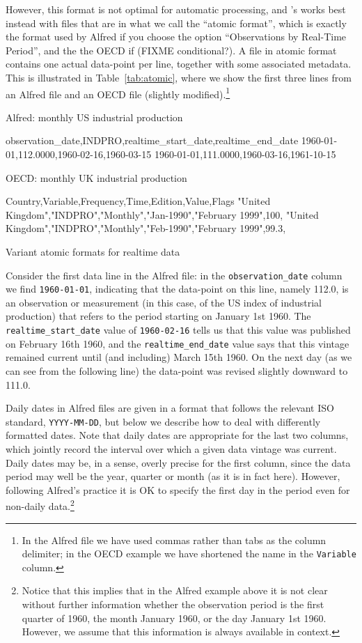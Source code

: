 However, this format is not optimal for automatic processing, and
's  works best instead with files that are in
what we call the ``atomic format'', which is exactly the format used
by Alfred if you choose the option ``Observations by Real-Time
Period'', and the the OECD if (FIXME conditional?). A file in atomic
format contains one actual data-point per line, together with some
associated metadata. This is illustrated in Table~\ref{tab:atomic},
where we show the first three lines from an Alfred file and an OECD
file (slightly modified).\footnote{In the Alfred file we have used
  commas rather than tabs as the column delimiter; in the OECD example
  we have shortened the name in the \texttt{Variable} column.}

\begin{table}[htbp]
\begin{center}
Alfred: monthly US industrial production
\begin{code}
observation_date,INDPRO,realtime_start_date,realtime_end_date
1960-01-01,112.0000,1960-02-16,1960-03-15
1960-01-01,111.0000,1960-03-16,1961-10-15
\end{code}
OECD: monthly UK industrial production
\begin{code}
Country,Variable,Frequency,Time,Edition,Value,Flags
"United Kingdom","INDPRO","Monthly","Jan-1990","February 1999",100,
"United Kingdom","INDPRO","Monthly","Feb-1990","February 1999",99.3,
\end{code}
\end{center}
\caption{Variant atomic formats for realtime data}
\label{tab:atomic}
\end{table}

Consider the first data line in the Alfred file: in the
\verb|observation_date| column we find \texttt{1960-01-01}, indicating
that the data-point on this line, namely 112.0, is an observation or
measurement (in this case, of the US index of industrial production)
that refers to the period starting on January 1st 1960. The
\verb|realtime_start_date| value of \texttt{1960-02-16} tells us that
this value was published on February 16th 1960, and the
\verb|realtime_end_date| value says that this vintage remained current
until (and including) March 15th 1960. On the next day (as we can see
from the following line) the data-point was revised slightly downward
to 111.0.

Daily dates in Alfred files are given in a format that follows the
relevant ISO standard, \texttt{YYYY-MM-DD}, but below we describe how
to deal with differently formatted dates. Note that daily dates are
appropriate for the last two columns, which jointly record the
interval over which a given data vintage was current. Daily dates may
be, in a sense, overly precise for the first column, since the data
period may well be the year, quarter or month (as it is in fact
here). However, following Alfred's practice it is OK to specify the
first day in the period even for non-daily data.\footnote{Notice that
  this implies that in the Alfred example above it is not clear
  without further information whether the observation period is the
  first quarter of 1960, the month January 1960, or the day January
  1st 1960.  However, we assume that this information is always
  available in context.}

